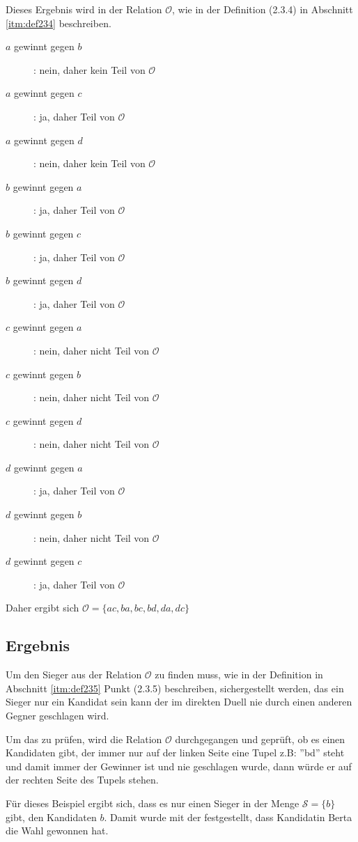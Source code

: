 Dieses Ergebnis wird in der Relation $\mathcal{O}$, wie in der Definition (2.3.4) in Abschnitt \ref{itm:def234} beschreiben.
\newpage
\begin{description}
\item[$a$ gewinnt gegen $b$]: nein, daher kein Teil von $\mathcal{O}$ 
\item[$a$ gewinnt gegen $c$]: ja, daher Teil von $\mathcal{O}$ 
\item[$a$ gewinnt gegen $d$]: nein, daher kein Teil von $\mathcal{O}$ 
\item[$b$ gewinnt gegen $a$]: ja, daher Teil von $\mathcal{O}$ 
\item[$b$ gewinnt gegen $c$]: ja, daher Teil von $\mathcal{O}$ 
\item[$b$ gewinnt gegen $d$]: ja, daher Teil von $\mathcal{O}$ 
\item[$c$ gewinnt gegen $a$]: nein, daher nicht Teil von $\mathcal{O}$ 
\item[$c$ gewinnt gegen $b$]: nein, daher nicht Teil von $\mathcal{O}$ 
\item[$c$ gewinnt gegen $d$]: nein, daher nicht Teil von $\mathcal{O}$ 
\item[$d$ gewinnt gegen $a$]: ja, daher Teil von $\mathcal{O}$ 
\item[$d$ gewinnt gegen $b$]: nein, daher nicht Teil von $\mathcal{O}$ 
\item[$d$ gewinnt gegen $c$]: ja, daher Teil von $\mathcal{O}$ 
\end{description} 

Daher ergibt sich $\mathcal{O} = \{ ac,ba,bc,bd,da,dc \}$

\subsection{Ergebnis} 
\label{sec:ergebnis1}
Um den Sieger aus der Relation $\mathcal{O}$ zu finden muss, wie in der Definition in Abschnitt \ref{itm:def235} Punkt (2.3.5) beschreiben, sichergestellt werden, das ein Sieger nur ein Kandidat sein kann der im direkten Duell nie durch einen anderen Gegner geschlagen wird.

Um das zu prüfen, wird die Relation $\mathcal{O}$ durchgegangen und geprüft, ob es einen Kandidaten gibt, der immer nur auf der linken Seite eine Tupel z.B: ''bd'' steht und damit immer der Gewinner ist und nie geschlagen wurde, dann würde er auf der rechten Seite des Tupels stehen.

Für dieses Beispiel ergibt sich, dass es nur einen Sieger in der Menge $\mathcal{S}=\{b\}$ gibt, den Kandidaten $b$. Damit wurde mit der \schulze festgestellt, dass Kandidatin Berta die Wahl gewonnen hat.

